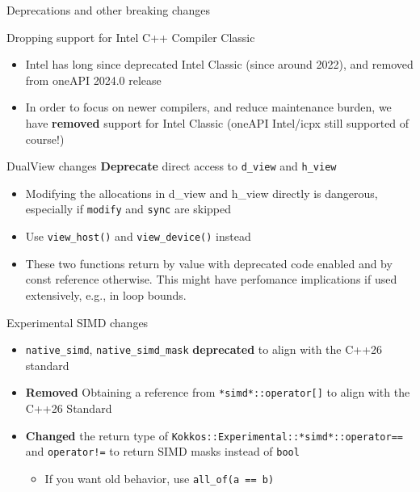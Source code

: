 
\begin{frame}[fragile]

  {\Huge Deprecations and other breaking changes}

  \vspace{10pt}

\end{frame}


\begin{frame}[fragile]{Dropping support for Intel C++ Compiler Classic}
  \begin{itemize}
    \item Intel has long since deprecated Intel Classic (since around 2022), and removed from oneAPI 2024.0 release
    \item In order to focus on newer compilers, and reduce maintenance burden, we have \textbf{removed} support for Intel Classic (oneAPI Intel/icpx still supported of course!)
  \end{itemize}
\end{frame}


\begin{frame}[fragile]{DualView changes}
  \textbf{Deprecate} direct access to \texttt{d\_view} and \texttt{h\_view}
  \begin{itemize}
    \item Modifying the allocations in d\_view and h\_view directly is dangerous, especially if \texttt{modify} and \texttt{sync} are skipped
    \item Use \texttt{view\_host()} and \texttt{view\_device()} instead
    \item These two functions return by value with deprecated code enabled and by const reference otherwise. This might have perfomance implications if used extensively, e.g., in loop bounds.
  \end{itemize}
\end{frame}


\begin{frame}[fragile]{Experimental SIMD changes}
  \begin{itemize}
    \item \texttt{native\_simd}, \texttt{native\_simd\_mask} \textbf{deprecated} to align with the C++26 standard
    \item \textbf{Removed} Obtaining a reference from \texttt{*simd*::operator[]} to align with the C++26 Standard
    \item \textbf{Changed} the return type of \texttt{Kokkos::Experimental::*simd*::operator==} and \texttt{operator!=} to return SIMD masks instead of \texttt{bool}
    \begin{itemize}
      \item If you want old behavior, use \texttt{all\_of(a == b)}
    \end{itemize}
  \end{itemize}
\end{frame}

